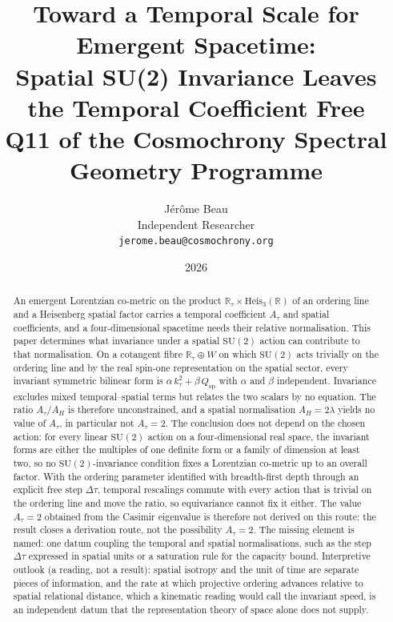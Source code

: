 \documentclass[12pt,a4paper]{article}
\title{Toward a Temporal Scale for Emergent Spacetime:\\
Spatial SU(2) Invariance Leaves the Temporal Coefficient Free\\[6pt]
{\large Q11 of the Cosmochrony Spectral Geometry Programme}}
\author{J\'er\^ome Beau\\
\small Independent Researcher\\
\small \texttt{jerome.beau@cosmochrony.org}}
\date{2026}
\newcommand{\Heis}{\mathrm{Heis}}
\newcommand{\SU}{\mathrm{SU}}
\begin{document}
  \maketitle

  \begin{abstract}
    An emergent Lorentzian co-metric on the product $\mathbb{R}_\tau\times\Heis_3(\mathbb{R})$ of an ordering line
    and a Heisenberg spatial factor carries a temporal coefficient $A_\tau$ and spatial coefficients, and a
    four-dimensional spacetime needs their relative normalisation.
    This paper determines what invariance under a spatial $\SU(2)$ action can contribute to that normalisation.
    On a cotangent fibre $\mathbb{R}_\tau\oplus W$ on which $\SU(2)$ acts trivially on the ordering line and by the
    real spin-one representation on the spatial sector, every invariant symmetric bilinear form is
    $\alpha\,k_\tau^2 + \beta\,Q_{\mathrm{sp}}$ with $\alpha$ and $\beta$ independent.
    Invariance excludes mixed temporal--spatial terms but relates the two scalars by no equation.
    The ratio $A_\tau/A_H$ is therefore unconstrained, and a spatial normalisation $A_H = 2\lambda$ yields no value
    of $A_\tau$, in particular not $A_\tau = 2$.
    The conclusion does not depend on the chosen action: for every linear $\SU(2)$ action on a four-dimensional real
    space, the invariant forms are either the multiples of one definite form or a family of dimension at least two,
    so no
    $\SU(2)$-invariance condition fixes a Lorentzian co-metric up to an overall factor.
    With the ordering parameter identified with breadth-first depth through an explicit free step $\Delta\tau$,
    temporal rescalings commute with every action that is trivial on the ordering line and move the ratio, so
    equivariance cannot fix it either.
    The value $A_\tau = 2$ obtained from the Casimir eigenvalue is therefore not derived on this route: the result
    closes a derivation route, not the possibility $A_\tau = 2$.
    The missing element is named: one datum coupling the temporal and spatial normalisations, such as the step
    $\Delta\tau$ expressed in spatial units or a saturation rule for the capacity bound.
    Interpretive outlook (a reading, not a result): spatial isotropy and the unit of time are separate pieces of
    information, and the rate at which projective ordering advances relative to spatial relational distance, which
    a kinematic reading would call the invariant speed, is an independent datum that the representation theory of
    space alone does not supply.
  \end{abstract}
\end{document}
